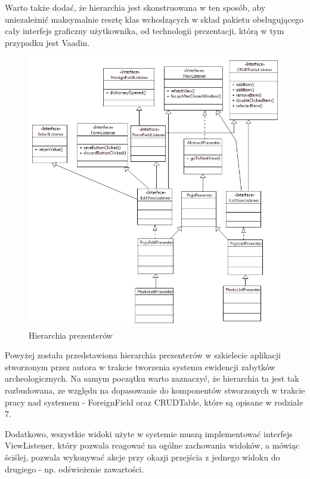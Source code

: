 Warto także dodać, że hierarchia jest skonstruowana w ten sposób, aby uniezależnić maksymalnie resztę klas wchodzących w skład pakietu obsługującego cały interfejs graficzny użytkownika, od technologii prezentacji, którą w tym przypadku jest Vaadin.

\newpage
\begin{figure} [H]
    \begin{center}
	\includegraphics[scale=.6]{img/presenterDiagram.png}
	\caption{Hierarchia prezenterów}
	\label{presenterHierarchy}
    \end{center}
\end{figure}

Powyżej została przedstawiona hierarchia prezenterów w szkielecie aplikacji stworzonym przez autora w trakcie tworzenia systemu ewidencji zabytków archeologicznych. Na samym początku warto zaznaczyć, że hierarchia ta jest tak rozbudowana, ze względu na dopasowanie do komponentów stworzonych w trakcie pracy nad systemem - ForeignField oraz CRUDTable, które są opisane w rodziale 7.

Dodatkowo, wszystkie widoki użyte w systemie muszą implementować interfejs ViewListener, który pozwala reagować na ogólne zachowania widoków, a mówiąc ściślej, pozwala wykonywać akcje przy okazji przejścia z jednego widoku do drugiego - np. odświeżenie zawartości. 


